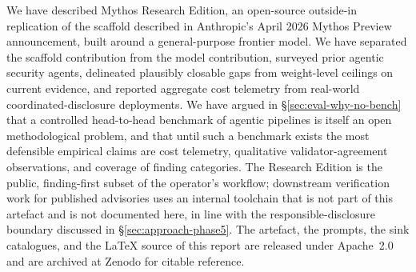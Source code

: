 \documentclass[11pt,a4paper]{article}
\begin{document}
We have described Mythos Research Edition, an open-source outside-in
replication of the scaffold described in Anthropic's April 2026 Mythos
Preview announcement, built around a general-purpose frontier model. We
have separated the scaffold contribution from the model contribution,
surveyed prior agentic security agents, delineated plausibly closable
gaps from weight-level ceilings on current evidence, and reported
aggregate cost telemetry from real-world coordinated-disclosure
deployments. We have argued in \S\ref{sec:eval-why-no-bench} that a
controlled head-to-head benchmark of agentic pipelines is itself an open
methodological problem, and that until such a benchmark exists the most
defensible empirical claims are cost telemetry, qualitative
validator-agreement observations, and coverage of finding categories.
The Research Edition is the public, finding-first subset of the
operator's workflow; downstream verification work for published
advisories uses an internal toolchain that is not part of this
artefact and is not documented here, in line with the
responsible-disclosure boundary discussed in
\S\ref{sec:approach-phase5}. The artefact, the prompts, the sink
catalogues, and the LaTeX source of this report are released under
Apache~2.0 and are archived at Zenodo for citable reference.



\end{document}

